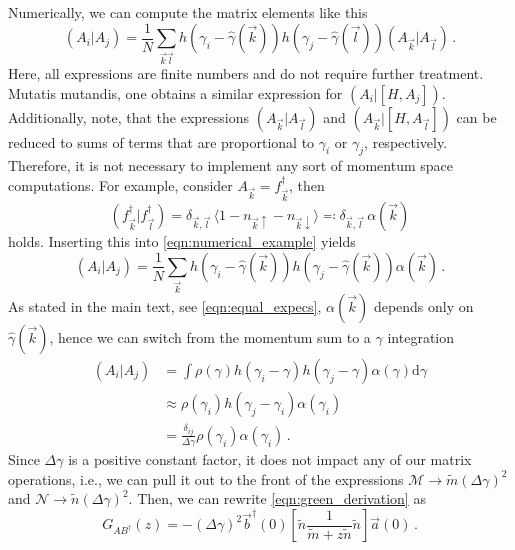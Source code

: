 \documentclass[
    reprint, 
    aps,
    preprintnumbers,
    twocolumn,
    prb,
    superscriptaddress
]{revtex4-2}
\newcommand{\vk}{\vec{k}}
\newcommand{\vl}{\vec{l}}
\newcommand{\dgamma}{\mathrm{d}\gamma}
\newcommand{\mM}{\mathcal{M}}
\newcommand{\mN}{\mathcal{N}}
\begin{document}
Numerically, we can compute the matrix elements like this
\begin{equation}
    \label{eqn:numerical_example}
    (A_i | A_j) = \frac{1}{N} \sum_{\vk \vl} h(\gamma_i - \hat{\gamma}(\vk)) h(\gamma_j - \hat{\gamma}(\vl)) (A_{\vk} | A_{\vl})\,.
\end{equation}
Here, all expressions are finite numbers and do not require further treatment.
Mutatis mutandis, one obtains a similar expression for $(A_i | [H, A_j])$.
Additionally, note, that the expressions $(A_{\vk} | A_{\vl})$ and $(A_{\vk} | [H, A_{\vl}])$ can be reduced to sums of terms that are proportional to $\gamma_i$ or $\gamma_j$, respectively.
Therefore, it is not necessary to implement any sort of momentum space computations.
For example, consider $A_{\vk} = f_{\vk}^\dagger$, then
\begin{equation}
    ( f_{\vk}^\dagger | f_{\vl}^\dagger ) = \delta_{\vk, \vl}\, \langle 1 - n_{\vk \uparrow} - n_{\vk \downarrow} \rangle \eqqcolon \delta_{\vk, \vl}\, \alpha(\vk)
\end{equation}
holds. Inserting this into \eqref{eqn:numerical_example} yields
\begin{equation}
    (A_i | A_j) = \frac{1}{N} \sum_{\vk} h(\gamma_i - \hat{\gamma}(\vk)) h(\gamma_j - \hat{\gamma}(\vk)) \alpha(\vk)\,.
\end{equation}
As stated in the main text, see \eqref{eqn:equal_expecs}, $\alpha(\vk)$ depends only on $\hat{\gamma}(\vk)$, hence we can switch from the momentum sum to a $\gamma$ integration
\begin{align}
    (A_i | A_j) &= \int \rho(\gamma) h(\gamma_i - \gamma) h(\gamma_j - \gamma) \alpha(\gamma) \dgamma \nonumber \\
        &\approx \rho(\gamma_i) h(\gamma_j - \gamma_i) \alpha(\gamma_i) \nonumber \\
        &= \frac{\delta_{ij}}{\Delta \gamma} \rho(\gamma_i) \alpha(\gamma_i)\,.
\end{align}
Since $\Delta \gamma$ is a positive constant factor, it does not impact any of our matrix operations, i.e., we can pull it out to the front of the expressions $\mM \to \tilde{m} (\Delta \gamma)^2$ and $\mN \to \tilde{n} (\Delta \gamma)^2$.
Then, we can rewrite \eqref{eqn:green_derivation} as
\begin{equation}
    G_{AB^\dagger}(z) = - (\Delta \gamma)^2 \vec{b}^\dagger (0) \left[ \tilde{n} \frac{1}{\tilde{m} + z \tilde{n}} \tilde{n} \right] \vec{a}(0)\,.
\end{equation}
\end{document}
